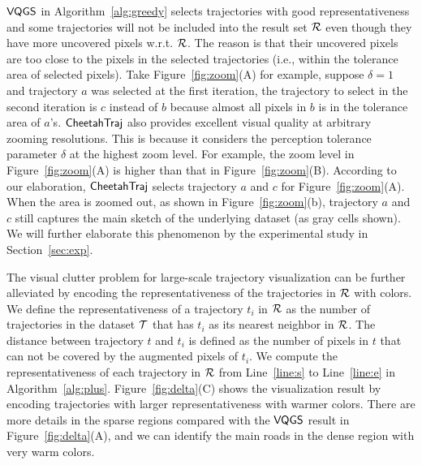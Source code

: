 

$\mathsf{VQGS}$ in Algorithm~\ref{alg:greedy} selects trajectories with good representativeness and some trajectories will not be included into the result set $\mathcal{R}$ even though they have more uncovered pixels w.r.t. $\mathcal{R}$. The reason is that their uncovered pixels are too close to the pixels in the selected trajectories (i.e., within the tolerance area of selected pixels). Take Figure~\ref{fig:zoom}(A) for example, suppose $\delta=1$ and trajectory $a$ was selected at the first iteration, the trajectory to select in the second iteration is $c$ instead of $b$ because almost all pixels in $b$ is in the tolerance area of $a$'s. $\mathsf{CheetahTraj}$ also provides excellent visual quality at arbitrary zooming resolutions. This is because it considers the perception tolerance parameter $\delta$  at the highest zoom level. For example, the zoom level in Figure~\ref{fig:zoom}(A) is higher than that in Figure~\ref{fig:zoom}(B).
According to our elaboration, $\mathsf{CheetahTraj}$ selects trajectory $a$ and $c$ for Figure~\ref{fig:zoom}(A).
When the area is zoomed out, as shown in Figure~\ref{fig:zoom}(b), trajectory $a$ and $c$ still captures the main sketch of the underlying dataset (as gray cells shown).
We will further elaborate this phenomenon by the experimental study in Section~\ref{sec:exp}.



The visual clutter problem for large-scale trajectory visualization can be further alleviated by encoding the representativeness of the trajectories in $\mathcal{R}$ with colors. We define the representativeness of a trajectory $t_i$ in $\mathcal{R}$ as the number of trajectories in the dataset $\mathcal{T}$ that has $t_i$ as its nearest neighbor in $\mathcal{R}$. The distance between trajectory $t$ and $t_i$ is defined as the number of pixels in $t$ that can not be covered by the augmented pixels of $t_i$. We compute the representativeness of each trajectory in $\mathcal{R}$ from Line~\ref{line:s} to Line~\ref{line:e} in Algorithm~\ref{alg:plus}. Figure~\ref{fig:delta}(C) shows the visualization result by encoding trajectories with larger representativeness with warmer colors. There are more details in the sparse regions compared with the $\mathsf{VQGS}$ result in Figure~\ref{fig:delta}(A), and we can identify the main roads in the dense region with very warm colors.

